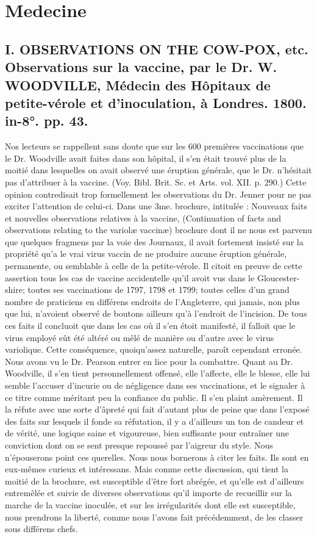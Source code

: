 \setcounter{page}{352}
\chapter{Medecine}
\section{I. OBSERVATIONS ON THE COW-POX, etc. Observations sur la vaccine, par le Dr. W. WOODVILLE, Médecin des Hôpitaux de petite-vérole et d’inoculation, à Londres. 1800. in-8°. pp. 43.}
Nos lecteurs se rappellent sans doute que sur les 600 premières vaccinations que le Dr. Woodville avait faites dans son hôpital, il s'en était trouvé plus de la moitié dans lesquelles on avait observé une éruption générale, que le Dr. n'hésitait pas d'attribuer à la vaccine. (Voy. Bibl. Brit. Sc. et Arts. vol. XII. p. 290.) Cette opinion contredisait trop formellement les observations du Dr. Jenner pour ne pas exciter l'attention de celui-ci. Dans une 3me. brochure, intitulée : Nouveaux faits et nouvelles observations relatives à la vaccine, (Continuation of facts and observations relating to the variolæ vaccinæ) brochure dont il ne nous est parvenu que quelques fragmens par la voie des Journaux, il avait fortement insisté sur la\setcounter{page}{353} propriété qu'a le vrai virus vaccin de ne produire aucune éruption générale, permanente, ou semblable à celle de la petite-vérole. Il citoit en preuve de cette assertion tous les cas de vaccine accidentelle qu'il avoit vus dans le Gloucester-shire; toutes ses vaccinations de 1797, 1798 et 1799; toutes celles d'un grand nombre de praticiens en différens endroits de l'Angleterre, qui jamais, non plus que lui, n'avoient observé de boutons ailleurs qu'à l'endroit de l'incision. De tous ces faits il concluoit que dans les cas où il s'en étoit manifesté, il falloit que le virus employé eût été altéré ou mêlé de manière ou d'autre avec le virus variolique.
Cette conséquence, quoiqu'assez naturelle, paroît cependant erronée. Nous avons vu le Dr. Pearson entrer en lice pour la combattre. Quant au Dr. Woodville, il s'en tient personnellement offensé, elle l'affecte, elle le blesse, elle lui semble l'accuser d'incurie ou de négligence dans ses vaccinations, et le signaler à ce titre comme méritant peu la confiance du public. Il s'en plaint amèrement. Il la réfute avec une sorte d'âpreté qui fait d'autant plus de peine que dans l'exposé des faits sur lesquels il fonde sa réfutation, il y a d'ailleurs un ton de candeur et de vérité, une logique saine et vigoureuse,\setcounter{page}{354} bien suffisante pour entraîner une conviction dont on se sent presque repoussé par l'aigreur du style.
Nous n'épouserons point ces querelles. Nous nous bornerons à citer les faits. Ils sont en eux-mêmes curieux et intéressans. Mais comme cette discussion, qui tient la moitié de la brochure, est susceptible d'être fort abrégée, et qu'elle est d'ailleurs entremêlée et suivie de diverses observations qu'il importe de recueillir sur la marche de la vaccine inoculée, et sur les irrégularités dont elle est susceptible, nous prendrons la liberté, comme nous l'avons fait précédemment, de les classer sous différens chefs.
